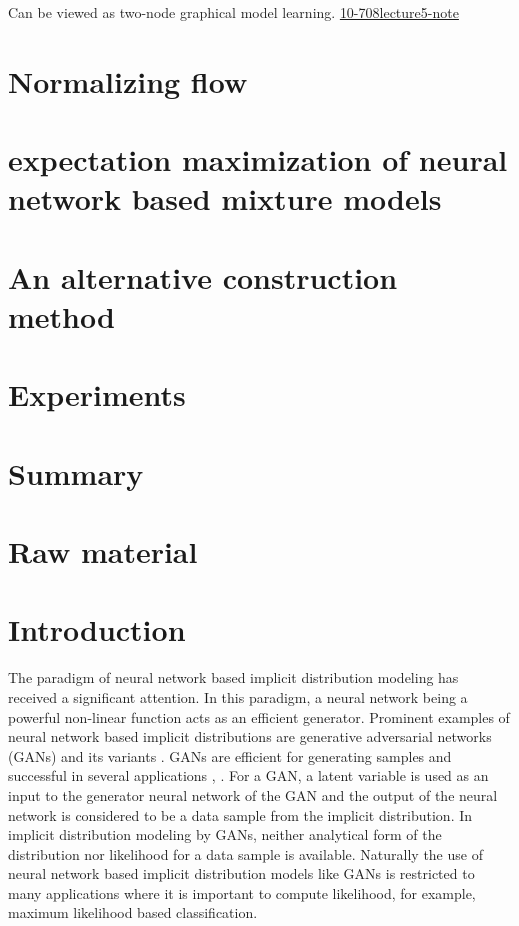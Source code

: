 Can be viewed as two-node graphical model learning. \href{https://sailinglab.github.io/pgm-spring-2019/notes/lecture-05/}{10-708lecture5-note}
\section{Normalizing flow}

\section{expectation maximization of neural network based mixture models}

\section{An alternative construction method}

\section{Experiments}


\section{Summary}

\section{Raw material}
\section{Introduction}

The paradigm of neural network based implicit distribution
modeling has received a significant attention. In this paradigm, a neural network being a powerful non-linear function acts as an efficient generator. Prominent examples of neural network based implicit distributions are generative adversarial networks (GANs) \cite{NIPS2014_5423} and its
variants \cite{NIPS2016_6125,
  2018arXiv180508318Z, salimans2018improving}. GANs are efficient for generating samples and successful in several applications \cite{ledig2017photo}, \cite{NIPS2016_6125}. For a GAN, a latent variable is used as
an input to the generator neural network of the GAN and the output of the
neural network is considered to be a data sample from the implicit
distribution.  In implicit distribution modeling by GANs, neither
analytical form of the distribution nor likelihood for a data sample
is available. Naturally the use of neural network based implicit distribution models like GANs is restricted to many applications where it is important to compute likelihood, for example, maximum likelihood based classification.

